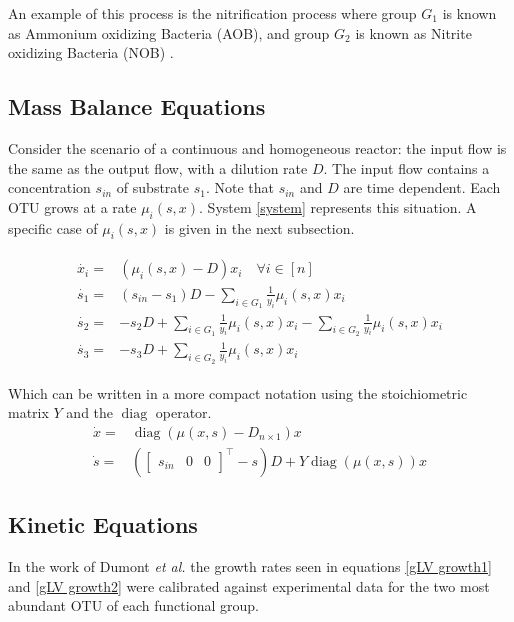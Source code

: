 \documentclass[3p,times]{article}
\DeclareMathOperator{\diag}{diag}
\begin{document}
An example of this process is the nitrification process where group $G_1$ is known as Ammonium oxidizing Bacteria (AOB), and group $G_2$ is known as Nitrite oxidizing Bacteria (NOB) \cite{SHARMA1977897}. 
\subsection{Mass Balance Equations}

Consider the scenario of a continuous and homogeneous reactor: the input flow is the same as the output flow, with a dilution rate $D$. The input flow contains a concentration $s_{in}$ of substrate $s_1$. Note that $s_{in}$ and $D$ are time dependent. Each OTU grows at a rate $\mu_i(s,x)$. System \eqref{system} represents this situation. A specific case of $\mu_i(s,x)$ is given in the next subsection. 

\begin{align} 
\label{system}
\begin{array}{cl}
\dot{x_i} =& \left(\mu_i(s,x) -D \right)x_i \quad \forall i \in [n] \\
\dot{s_1} =& \displaystyle (s_{in}-s_1)D - \sum\limits_{i\in G_1} \frac{1}{y_i} \mu_i(s,x) x_i  \\
\dot{s_2} = & \displaystyle -s_2D+\sum\limits_{i\in G_1} \frac{1}{y_i} \mu_i(s,x) x_i -\sum\limits_{i\in G_2} \frac{1}{y_i} \mu_i(s,x) x_i \\
\dot{s_3} =&  \displaystyle -s_3D+\sum\limits_{i\in G_2} \frac{1}{y_i} \mu_i(s,x) x_i  
\end{array}
\end{align}	

Which can be written in a more compact notation using the stoichiometric matrix $Y$ and the $\diag$ operator.
\begin{align}
\label{Eq1X}	\dot{x} = & \diag(\mu(x,s) - D_{n\times 1})x \\
\label{EqS}	\dot{s} = & \left(\begin{bmatrix} s_{in}&0&0 \end{bmatrix}^\top-s\right)D + Y\diag(\mu(x,s))x
\end{align} 

\subsection{Kinetic Equations}
In the work of Dumont \textit{et al.} \cite{Dumont2016} the growth rates seen in equations \eqref{gLV growth1} and \eqref{gLV growth2} were calibrated against experimental data for the two most abundant OTU of each functional group.
\end{document}
